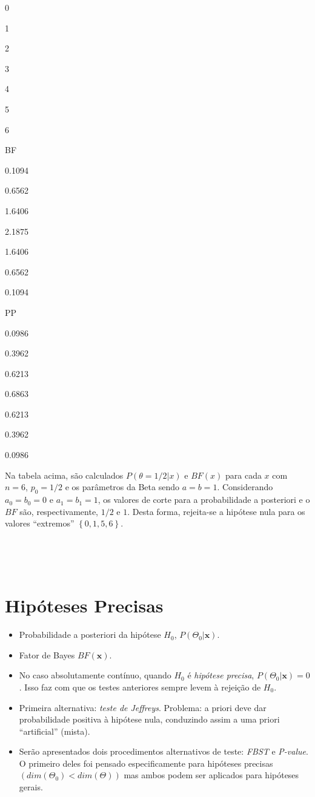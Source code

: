 \documentclass[
]{book}
\begin{document}
0

1

2

3

4

5

6

BF

0.1094

0.6562

1.6406

2.1875

1.6406

0.6562

0.1094

PP

0.0986

0.3962

0.6213

0.6863

0.6213

0.3962

0.0986

Na tabela acima, são calculados \(P(\theta=1/2|x)\) e \(BF(x)\) para cada \(x\) com \(n=6\), \(p_0=1/2\) e os parâmetros da Beta sendo \(a=b=1\). Considerando \(a_0=b_0=0\) e \(a_1=b_1=1\), os valores de corte para a probabilidade a posteriori e o \(BF\) são, respectivamente, \(1/2\) e \(1\). Desta forma, rejeita-se a hipótese nula para os valores ``extremos'' \(\left\{0,1,5,6\right\}\).

\(~\)

\(~\)

\hypertarget{hipuxf3teses-precisas}{%
\section{Hipóteses Precisas}\label{hipuxf3teses-precisas}}

\begin{itemize}
\item
  Probabilidade a posteriori da hipótese \(H_0\), \(P(\Theta_0|\boldsymbol x)\).
\item
  Fator de Bayes \(BF(\boldsymbol x)\).
\item
  No caso absolutamente contínuo, quando \(H_0\) é \emph{hipótese precisa}, \(P(\Theta_0|\boldsymbol x)=0\). Isso faz com que os testes anteriores sempre levem à rejeição de \(H_0\).
\item
  Primeira alternativa: \emph{teste de Jeffreys}. Problema: a priori deve dar probabilidade positiva à hipótese nula, conduzindo assim a uma priori ``artificial'' (mista).
\item
  Serão apresentados dois procedimentos alternativos de teste: \emph{FBST} e \emph{P-value}. O primeiro deles foi pensado especificamente para hipóteses precisas \(\left(dim(\Theta_0)<dim(\Theta)\right)\) mas ambos podem ser aplicados para hipóteses gerais.
\end{itemize}
\end{document}
